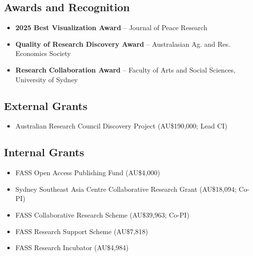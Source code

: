\documentclass[10pt]{article}
\begin{document}
	\subsection*{Awards and Recognition}
	\begin{itemize}
		\item {} \textbf{2025 Best Visualization Award} -- Journal of Peace Research
		\item {} \textbf{Quality of Research Discovery Award} -- Australasian Ag. and Res. Economics Society
		\item {} \textbf{Research Collaboration Award} -- Faculty of Arts and Social Sciences, University of Sydney
	\end{itemize}
	
	\begin{refsection}
		\nocite{ubilava2026,hastings2025,ubilava2023ajae,ferguson2022,ubilava2022agec,hastings2022,angus2021,atalay2021,ubilava2019el,ubilava2019erl,ubilava2019md,ubilava2018ajae,smith2017gec,ubilava2017wd,tack2015agec,ubilava2014erae,tack2013cc,ubilava2013ems,ubilava2013ajare,ubilava2012agec,ubilava2012agri,ubilava2011jare,ubilava2011jcb,ubilava2010tfsc,ubilava2009fp}
		\printbibliography[heading={article}]
	\end{refsection}
	
	\begin{refsection}
		\nocite{meat_resilience,prices_protests,missions_misaligned,aid_interrupted}
		\printbibliography[heading={progress}]
	\end{refsection}
	
	\subsection*{External Grants}
	\begin{itemize}
		\item {} Australian Research Council Discovery Project (AU\$190,000; Lead CI)
	\end{itemize}
	\subsection*{Internal Grants}
	\begin{itemize}
		\item {} FASS Open Access Publishing Fund (AU\$4,000)
		\item {} Sydney Southeast Asia Centre Collaborative Research Grant (AU\$18,094; Co-PI)
		\item {} FASS Collaborative Research Scheme (AU\$39,963; Co-PI)
		\item {} FASS Research Support Scheme (AU\$7,818)
		\item {} FASS Research Incubator (AU\$4,984)
	\end{itemize}
	
\end{document}
